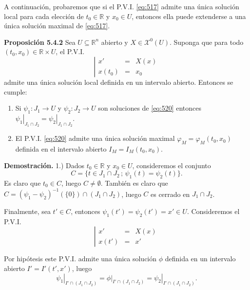 \documentclass[11pt,a4paper]{article}
\theoremstyle{definition}
\theoremstyle{plain}
\theoremstyle{remark}
\begin{document}
	A continuación, probaremos que si el P.V.I. \eqref{eq:517} admite una única solución local para cada elección de $t_0 \in \mathbb{R}$ y $x_0 \in U$, entonces ella puede extenderse a una única solución maximal de \eqref{eq:517}.
	
	\noindent \textbf{Proposición 5.4.2} Sea $U \subseteq \mathbb{R}^n$ abierto y $X \in \mathcal{X}^0(U)$. Suponga que para todo $(t_0, x_0) \in \mathbb{R} \times U$, el P.V.I.
	\begin{equation}\label{eq:520}
		\left| 
		\begin{array}{lcl}
			x' &=& X(x) \\
			x(t_0) &=& x_0
		\end{array}
		\right.
	\end{equation}
	admite una única solución local definida en un intervalo abierto. Entonces se cumple:
	
	\begin{enumerate}
		\item Si $\psi_1 : J_1 \to U$ y $\psi_2 : J_2 \to U$ son soluciones de \eqref{eq:520} entonces $\left.\psi_1\right|_{J_1 \cap J_2} = \left.\psi_2\right|_{J_1 \cap J_2}$.
		\item El P.V.I. \eqref{eq:520} admite una única solución maximal $\varphi_M = \varphi_M(t_0, x_0)$ definida en el intervalo abierto $I_M = I_M(t_0, x_0)$.
	\end{enumerate}
	
	\noindent \textbf{Demostración.} 1.) Dados $t_0 \in \mathbb{R}$ y $x_0 \in U$, consideremos el conjunto
	\[
	C = \{t \in J_1 \cap J_2 \,;\, \psi_1(t) = \psi_2(t)\}.
	\]
	Es claro que $t_0 \in C$, luego $C \neq \emptyset$. También es claro que $C = (\psi_1 - \psi_2)^{-1}(\{0\}) \cap (J_1 \cap J_2)$, luego $C$ es cerrado en $J_1 \cap J_2$.
	
	Finalmente, sea $t' \in C$, entonces $\psi_1(t') = \psi_2(t') = x' \in U$. Consideremos el P.V.I.
	\begin{equation*}
		\left| 
		\begin{array}{lcl}
			x' &=& X(x) \\
			x(t') &=& x'
		\end{array}
		\right.
	\end{equation*}
	
	Por hipótesis este P.V.I. admite una única solución $\phi$ definida en un intervalo abierto $I' = I'(t', x')$, luego
	\[
	\left.\psi_1\right|_{I' \cap (J_1 \cap J_2)} = \left.\phi\right|_{I' \cap (J_1 \cap J_2)} = \left.\psi_2\right|_{I' \cap (J_1 \cap J_2)}.
	\]
	
\end{document}
